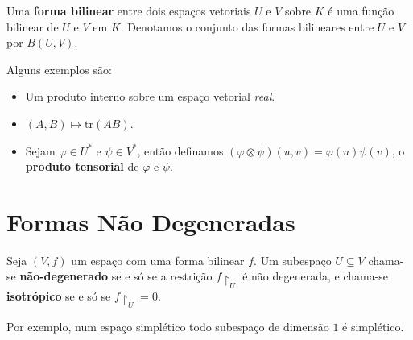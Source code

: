 \documentclass[11pt,twoside,a4paper]{book}
\begin{document}
\begin{definicao}
Uma \textbf{forma bilinear} entre dois espaços vetoriais $U$ e $V$ sobre $K$ é uma função bilinear de $U$ e $V$ em $K$. Denotamos o conjunto das formas bilineares entre $U$ e $V$ por $B(U,V)$.
\end{definicao}

\begin{exemplo}
Alguns exemplos são:
\begin{itemize}
\item Um produto interno sobre um espaço vetorial \textit{real}.
\item $(A,B)\mapsto\mathrm{tr}(AB)$.
\item Sejam $\varphi\in U^*$ e $\psi\in V^*$, então definamos $(\varphi\otimes\psi)(u,v)=\varphi(u)\psi(v)$, o \textbf{produto tensorial} de $\varphi$ e $\psi$.
\end{itemize}
\end{exemplo}

\section{Formas Não Degeneradas}

\begin{definicao}
Seja $(V,f)$ um espaço com uma forma bilinear $f$. Um subespaço $U\subseteq V$ chama-se \textbf{não-degenerado} se e só se a restrição $f\upharpoonright_U$ é não degenerada, e chama-se \textbf{isotrópico} se e só se $f\upharpoonright_U=0$.
\end{definicao}

\noindent
Por exemplo, num espaço simplético todo subespaço de dimensão $1$ é simplético.
\end{document}
